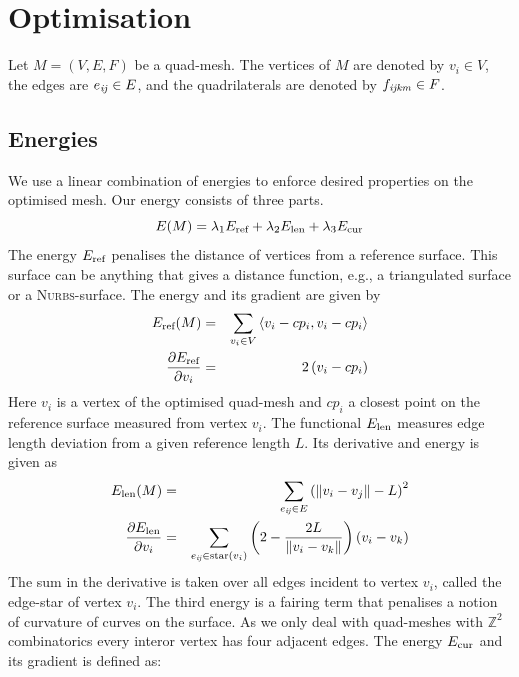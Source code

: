 
\section{Optimisation}
Let $M=(V,E,F)$ be a quad-mesh. The vertices of $M$ are denoted by $v_i \in V$, the edges
are $e_{\mathrm{\it{ij}}} \in E$, and the quadrilaterals are denoted by $f_{\mathrm{\it{ijkm}}} \in F$.
\subsection{Energies}
We use a linear combination of energies to enforce desired properties on the optimised mesh.
Our energy consists of three parts.
\begin{equation}
	E(M) =	\lambda_1 E_{\textrm{\scriptsize{ref}}} + 
		\lambda_2 E_{\textrm{\scriptsize{len}}} +
		\lambda_3 E_{\textrm{\scriptsize{cur}}}
	\label{eq:energy_combination}
\end{equation}
The energy $E_{\textrm{\scriptsize{ref}}}$ penalises the distance of vertices from a
reference surface. This surface can be anything that gives a distance function, e.g., a
triangulated surface or a \textsc{Nurbs}-surface. The energy and its gradient are given 
by
\begin{eqnarray*}
	E_{\textrm{\scriptsize{ref}}}(M) &=& 
	\sum_{v_i \in V}\left<v_i - cp_i, v_i - cp_i\right> \\
	\frac{\partial E_\textrm{\scriptsize{ref}}}{\partial v_i} &=&
	2\left(v_i - cp_i\right)
	\label{eq:energy_reference}
\end{eqnarray*}
Here $v_i$ is a vertex of the optimised quad-mesh and $cp_i$ a closest point on the reference
surface measured from vertex $v_i$. The functional $E_{\textrm{\scriptsize{len}}}$ measures
edge length deviation from a given reference length $L$. Its derivative and energy is given as
\begin{eqnarray*}
	E_{\textrm{\scriptsize{len}}}(M) &=& 
	\sum_{e_{\mathrm{\it{ij}}} \in E} \left(\Vert v_i - v_j \Vert - L\right)^2\\
	\frac{\partial E_\textrm{\scriptsize{len}}}{\partial v_i} &=& 
	\sum_{e_{\mathrm{\it{ij}}} \in \textrm{\scriptsize{star}}(v_i)}
	\left(2 - \frac{2L}{\Vert v_i - v_k \Vert}\right)\left(v_i - v_k \right)
\end{eqnarray*}
The sum in the derivative is taken over all edges incident to vertex $v_i$, called the 
edge-star of vertex $v_i$. The third energy is a fairing term that penalises a notion of
curvature of curves on the surface. As we only deal with quad-meshes with $\mathbb Z^2$ combinatorics every interor vertex has four adjacent edges. The energy $E_{\textrm{\scriptsize{cur}}}$ and its gradient is defined as:
